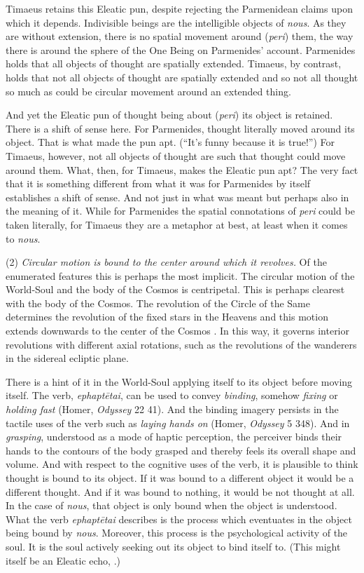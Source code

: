 Timaeus retains this Eleatic pun, despite rejecting the Parmenidean claims upon which it depends. Indivisible beings are the intelligible objects of \emph{nous}. As they are without extension, there is no spatial movement around (\emph{peri}) them, the way there is around the sphere of the One Being on Parmenides' account. Parmenides holds that all objects of thought are spatially extended. Timaeus, by contrast, holds that not all objects of thought are spatially extended and so not all thought so much as could be circular movement around an extended thing.

And yet the Eleatic pun of thought being about (\emph{peri}) its object is retained. There is a shift of sense here. For Parmenides, thought literally moved around its object. That is what made the pun apt. (``It's funny because it is true!'') For Timaeus, however, not all objects of thought are such that thought could move around them. What, then, for Timaeus, makes the Eleatic pun apt? The very fact that it is something different from what it was for Parmenides by itself establishes a shift of sense. And not just in what was meant but perhaps also in the meaning of it. While for Parmenides the spatial connotations of \emph{peri} could be taken literally, for Timaeus they are a metaphor at best, at least when it comes to \emph{nous}.

(2) \emph{Circular motion is bound to the center around which it revolves.} Of the enumerated features this is perhaps the most implicit. The circular motion of the World-Soul and the body of the Cosmos is centripetal. This is perhaps clearest with the body of the Cosmos. The revolution of the Circle of the Same determines the revolution of the fixed stars in the Heavens and this motion extends downwards to the center of the Cosmos \citep[32]{Vlastos:1975aa}. In this way, it governs interior revolutions with different axial rotations, such as the revolutions of the wanderers in the sidereal ecliptic plane.

There is a hint of it in the World-Soul applying itself to its object before moving itself. The verb, \emph{ephaptētai}, can be used to convey \emph{binding}, somehow \emph{fixing} or \emph{holding fast} (Homer, \emph{Odyssey} 22 41). And the binding imagery persists in the tactile uses of the verb such as \emph{laying hands on} (Homer, \emph{Odyssey} 5 348). And in \emph{grasping}, understood as a mode of haptic perception, the perceiver binds their hands to the contours of the body grasped and thereby feels its overall shape and volume. And with respect to the cognitive uses of the verb, it is plausible to think thought is bound to its object. If it was bound to a different object it would be a different thought. And if it was bound to nothing, it would be not thought at all. In the case of \emph{nous}, that object is only bound when the object is understood. What the verb \emph{ephaptētai} describes is the process which eventuates in the object being bound by \emph{nous}. Moreover, this process is the psychological activity of the soul. It is the soul actively seeking out its object to bind itself to. (This might itself be an Eleatic echo, \citealt[192]{Mourelatos:2008ve}.)

